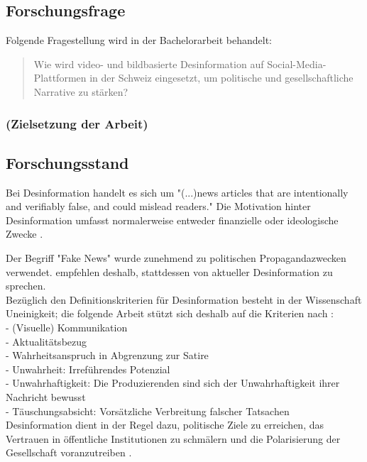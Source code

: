 \documentclass[12pt,a4paper]{article}        %
\begin{document}
\subsection{Forschungsfrage}
Folgende Fragestellung wird in der Bachelorarbeit behandelt:\\

\begin{quote}
  Wie wird video- und bildbasierte Desinformation auf Social-Media-Plattformen in der Schweiz eingesetzt, um politische und gesellschaftliche Narrative zu stärken?
\end{quote}

\subsubsection{(Zielsetzung der Arbeit)}

\subsection{Forschungsstand}

Bei Desinformation handelt es sich um "(...)news articles that are intentionally and verifiably false, and could mislead readers." \parencite[213]{allcott_social_2017} Die Motivation hinter Desinformation umfasst normalerweise entweder finanzielle oder ideologische Zwecke \parencites[vgl.][138]{tandoc_defining_2018}[225]{schmidt_meinungsbildung_2022}[154-155]{lange_unsicherheit_2019}.

Der Begriff "Fake News" wurde zunehmend zu politischen Propagandazwecken verwendet. \Textcite[148]{marx_fake_2020} empfehlen deshalb, stattdessen von aktueller Desinformation zu sprechen. \\
Bezüglich den Definitionskriterien für Desinformation besteht in der Wissenschaft Uneinigkeit; die folgende Arbeit stützt sich deshalb auf die Kriterien nach \textcite{marx_fake_2020}: \\
- (Visuelle) Kommunikation \\
- Aktualitätsbezug \\
- Wahrheitsanspruch in Abgrenzung zur Satire \\
- Unwahrheit: Irreführendes Potenzial \\
- Unwahrhaftigkeit: Die Produzierenden sind sich der Unwahrhaftigkeit ihrer Nachricht bewusst \\
- Täuschungsabsicht: Vorsätzliche Verbreitung falscher Tatsachen\\

Desinformation dient in der Regel dazu, politische Ziele zu erreichen, das Vertrauen in öffentliche Institutionen zu schmälern und die Polarisierung der Gesellschaft voranzutreiben \parencites[vgl.][ ]{allcott_social_2017}[225]{schmidt_meinungsbildung_2022}[162]{lange_unsicherheit_2019}. \\
\end{document}
